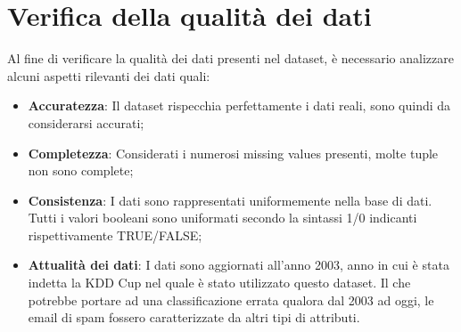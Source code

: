 \section{Verifica della qualità dei dati}
Al fine di verificare la qualità dei dati presenti nel dataset, è necessario analizzare alcuni aspetti rilevanti dei dati quali:
\begin{itemize}
	\item \textbf{Accuratezza}: Il dataset rispecchia perfettamente i dati reali, sono quindi da considerarsi accurati;
	\item \textbf{Completezza}: Considerati i numerosi missing values presenti, molte tuple non sono complete;
	\item \textbf{Consistenza}: I dati sono rappresentati uniformemente nella base di dati. Tutti i valori booleani sono uniformati secondo la sintassi 1/0 indicanti rispettivamente TRUE/FALSE;
	\item \textbf{Attualità dei dati}: I dati sono aggiornati all'anno 2003, anno in cui è stata indetta la KDD Cup nel quale è stato utilizzato questo dataset. Il che potrebbe portare ad una classificazione errata qualora dal 2003 ad oggi, le email di spam fossero caratterizzate da altri tipi di attributi.
\end{itemize}
%
%
%
